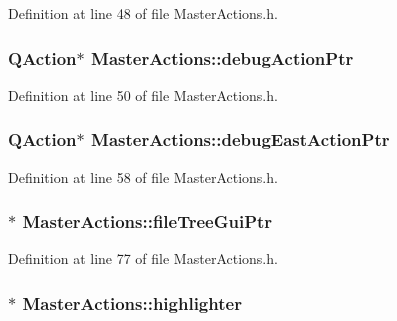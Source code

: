 Definition at line 48 of file Master\-Actions.\-h.

\hypertarget{class_master_actions_ae37993bbbed4a238ea3b11089ac46a61}{
\subsubsection[{debug\-Action\-Ptr}]{\setlength{\rightskip}{0pt plus 5cm}Q\-Action$\ast$ Master\-Actions\-::debug\-Action\-Ptr\hspace{0.3cm}{\ttfamily [private]}}}\label{class_master_actions_ae37993bbbed4a238ea3b11089ac46a61}


Definition at line 50 of file Master\-Actions.\-h.

\hypertarget{class_master_actions_ab26f3e610cb9e303ac3a987964dfac19}{
\subsubsection[{debug\-East\-Action\-Ptr}]{\setlength{\rightskip}{0pt plus 5cm}Q\-Action$\ast$ Master\-Actions\-::debug\-East\-Action\-Ptr\hspace{0.3cm}{\ttfamily [private]}}}\label{class_master_actions_ab26f3e610cb9e303ac3a987964dfac19}


Definition at line 58 of file Master\-Actions.\-h.

\hypertarget{class_master_actions_a53d5e999ea25b0d3d1643fca709f3bcb}{
\subsubsection[{file\-Tree\-Gui\-Ptr}]{$\ast$ Master\-Actions\-::file\-Tree\-Gui\-Ptr\hspace{0.3cm}{\ttfamily [private]}}}\label{class_master_actions_a53d5e999ea25b0d3d1643fca709f3bcb}


Definition at line 77 of file Master\-Actions.\-h.

\hypertarget{class_master_actions_a50b1565db8b7780ec4e88e59953aa67b}{
\subsubsection[{highlighter}]{$\ast$ Master\-Actions\-::highlighter\hspace{0.3cm}{\ttfamily [private]}}}\label{class_master_actions_a50b1565db8b7780ec4e88e59953aa67b}



